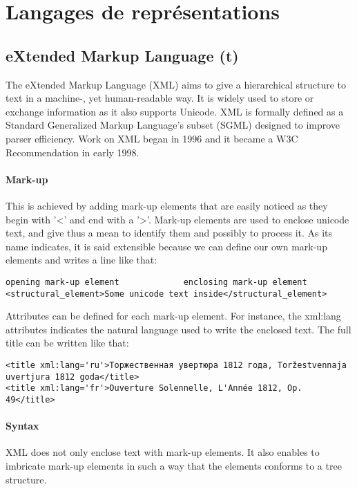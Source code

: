 \section{Langages de représentations}\label{s:mods}

\subsection{eXtended Markup Language (t)}
The eXtended Markup Language (XML) aims to give a hierarchical structure to  text in a machine-, yet human-readable way. It is widely used to store or exchange information as it also supports Unicode.
XML is formally defined as a Standard Generalized Markup Language's subset (SGML) designed to improve parser efficiency. Work on XML began in 1996 and it became a W3C Recommendation in early 1998.

\paragraph{Mark-up}
This is achieved by adding mark-up elements that are easily noticed as they begin with '<' and end with a '>'. Mark-up elements are used to enclose unicode text, and give thus a mean to identify them and possibly to process it. As its name indicates, it is said extensible because we can define our own mark-up elements and writes a line like that:

\begin{Verbatim}[fontsize=\small,formatcom=\color{black!70}]
opening mark-up element 			enclosing mark-up element
<structural_element>Some unicode text inside</structural_element>
\end{Verbatim}

Attributes can be defined for each mark-up element. 
For instance, the xml:lang attributes indicates the natural language used to write the enclosed text. The  full title can be written like that:
\begin{Verbatim}[fontsize=\small,formatcom=\color{black!70}]
<title xml:lang='ru'>Торжественная увертюра 1812 года, Toržestvennaja uvertjura 1812 goda</title>
<title xml:lang='fr'>Ouverture Solennelle, L'Année 1812, Op. 49</title>
\end{Verbatim}

\paragraph{Syntax}
XML does not only enclose text with mark-up elements. It also enables to imbricate mark-up elements in such a way that the elements conforms to a tree structure. 

